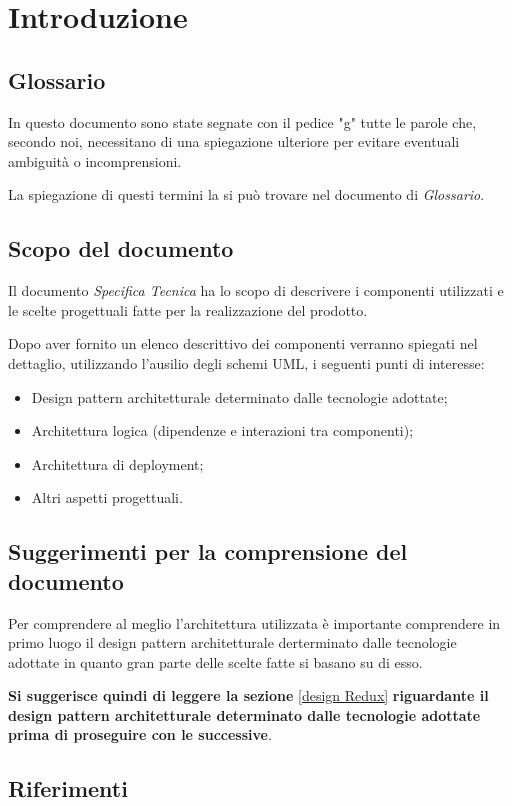 \section{Introduzione}

\subsection{Glossario}
In questo documento sono state segnate con il pedice "g" tutte le parole che, secondo noi, necessitano di una spiegazione ulteriore per evitare
eventuali ambiguità o incomprensioni.

La spiegazione di questi termini la si può trovare nel documento di \textit{Glossario}.

\subsection{Scopo del documento}
Il documento \textit{Specifica Tecnica} ha lo scopo di descrivere i componenti utilizzati e le scelte progettuali fatte per la realizzazione del prodotto.

Dopo aver fornito un elenco descrittivo dei componenti verranno spiegati nel dettaglio, utilizzando l'ausilio degli schemi UML, i seguenti punti di interesse: 
\begin{itemize}
	\item Design pattern architetturale determinato dalle tecnologie adottate;
	\item Architettura logica (dipendenze e interazioni tra componenti);
	\item Architettura di deployment;
	\item Altri aspetti progettuali.
\end{itemize}

\subsection{Suggerimenti per la comprensione del documento}
Per comprendere al meglio l'architettura utilizzata è importante comprendere in primo luogo il design pattern
architetturale derterminato dalle tecnologie adottate in quanto gran parte delle scelte fatte si basano su di esso.

\textbf{Si suggerisce quindi di leggere la sezione} \ref{design Redux} \textbf{riguardante il design pattern architetturale determinato 
dalle tecnologie adottate prima di proseguire con le successive}.

\subsection{Riferimenti}
